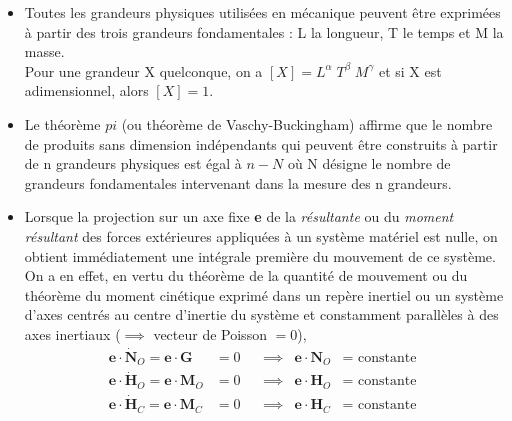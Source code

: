 \documentclass[a4paper]{article}
\begin{document}
\begin{itemize}






\item Toutes les grandeurs physiques utilisées en mécanique peuvent être exprimées à partir des trois grandeurs fondamentales : L la longueur, T le temps et M la masse. \\
Pour une grandeur X quelconque, on a $\displaystyle [X] = L^{\alpha} \; T^{\beta} \; M^{\gamma} $ et si X est adimensionnel, alors $\displaystyle [X] = 1 $.





\item Le théorème $ pi $ (ou théorème de Vaschy-Buckingham) affirme que le nombre de produits sans dimension indépendants qui peuvent être construits à partir de n grandeurs physiques est égal à $ n - N $ où N désigne le nombre de grandeurs fondamentales intervenant dans la mesure des n grandeurs.





\item Lorsque la projection sur un axe fixe \textbf{e} de la \emph{résultante} ou du \emph{moment résultant} des forces extérieures appliquées à un système matériel est nulle, on obtient immédiatement une intégrale première du mouvement de ce système. On a en effet, en vertu du théorème de la quantité de mouvement ou du théorème du moment cinétique exprimé dans un repère inertiel ou un système d'axes centrés au centre d'inertie du système et constamment parallèles à des axes inertiaux ($ \implies $ vecteur de Poisson $ = 0 $), 
\begin{align*}
\textbf{e} \cdot \dot{\textbf{N}}_O = \textbf{e} \cdot \textbf{G} &= 0 &&\implies &\textbf{e} \cdot \textbf{N}_O &= \text{ constante } \\
\textbf{e} \cdot \dot{\textbf{H}}_O = \textbf{e} \cdot \textbf{M}_O &= 0 &&\implies &\textbf{e} \cdot \textbf{H}_O &= \text{ constante } \\
\textbf{e} \cdot \dot{\textbf{H}}_C = \textbf{e} \cdot \textbf{M}_C &= 0 &&\implies &\textbf{e} \cdot \textbf{H}_C &= \text{ constante } \\
\end{align*}






\end{itemize}
\end{document}
